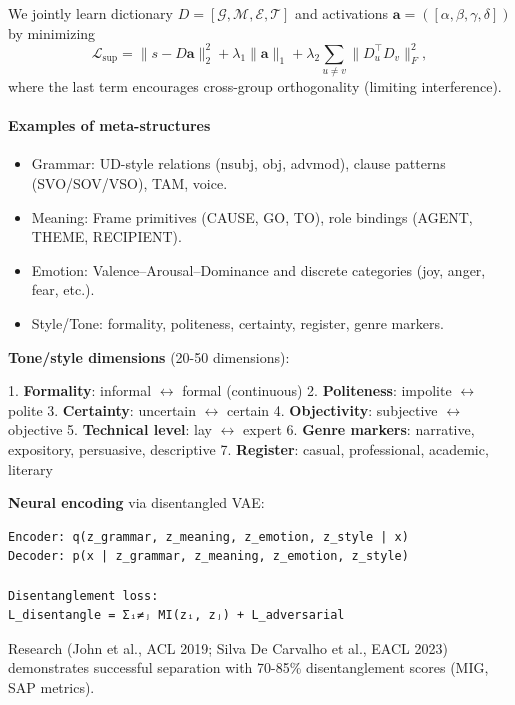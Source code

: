 \documentclass[11pt]{article}
\begin{document}
We jointly learn dictionary $D{=}[\mathcal{G},\mathcal{M},\mathcal{E},\mathcal{T}]$ and activations $\bm{a}{=}([\alpha,\beta,\gamma,\delta])$ by minimizing
\begin{equation}
\mathcal{L}_{\text{sup}}=\| s - D\bm{a} \|_2^2 + \lambda_1\|\bm{a}\|_1 + \lambda_2\sum_{u\ne v}\|D_u^\top D_v\|_F^2,
\end{equation}
where the last term encourages cross-group orthogonality (limiting interference).

\paragraph{Examples of meta-structures}
\begin{itemize}[noitemsep,topsep=2pt]
  \item Grammar: UD-style relations (nsubj, obj, advmod), clause patterns (SVO/SOV/VSO), TAM, voice.
  \item Meaning: Frame primitives (CAUSE, GO, TO), role bindings (AGENT, THEME, RECIPIENT).
  \item Emotion: Valence–Arousal–Dominance and discrete categories (joy, anger, fear, etc.).
  \item Style/Tone: formality, politeness, certainty, register, genre markers.
\end{itemize}

\textbf{Tone/style dimensions} (20-50 dimensions):

1. \textbf{Formality}: informal \(\leftrightarrow\) formal (continuous)
2. \textbf{Politeness}: impolite \(\leftrightarrow\) polite
3. \textbf{Certainty}: uncertain \(\leftrightarrow\) certain
4. \textbf{Objectivity}: subjective \(\leftrightarrow\) objective
5. \textbf{Technical level}: lay \(\leftrightarrow\) expert
6. \textbf{Genre markers}: narrative, expository, persuasive, descriptive
7. \textbf{Register}: casual, professional, academic, literary

\textbf{Neural encoding} via disentangled VAE:

\begin{verbatim}
Encoder: q(z_grammar, z_meaning, z_emotion, z_style | x)
Decoder: p(x | z_grammar, z_meaning, z_emotion, z_style)

Disentanglement loss:
L_disentangle = Σᵢ≠ⱼ MI(zᵢ, zⱼ) + L_adversarial
\end{verbatim}

Research (John et al., ACL 2019; Silva De Carvalho et al., EACL 2023) demonstrates successful separation with 70-85\% disentanglement scores (MIG, SAP metrics).
\end{document}
